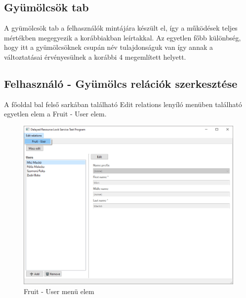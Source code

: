 \subsection{Gyümölcsök tab}

A gyümölcsök tab a felhasználók mintájára készült el, így a működések teljes mértékben megegyezik a korábbiakban leírtakkal. Az egyetlen főbb különbség, hogy itt a gyümölcsöknek csupán név tulajdonságuk van így annak a változtatásai érvényesülnek a korábbi 4 megemlített helyett.

\subsection{Felhasználó - Gyümölcs relációk szerkesztése}

A főoldal bal felső sarkában található Edit relations lenyíló menüben található egyetlen elem a Fruit - User elem.

\begin{figure}[H]
	\centering
	\includegraphics[width=1\textwidth]{images/EditUser-Fruit.png}
	\caption{Fruit - User menü elem}
	\label{fig:main_window}
\end{figure}

